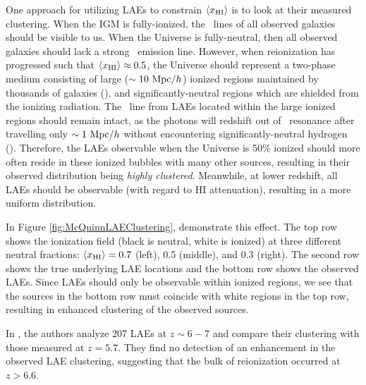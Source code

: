 One approach for utilizing LAEs to constrain $\langle x_{\text{HI}}\rangle$ is to look at their measured clustering. When the IGM is fully-ionized, the \lya\ lines of all observed galaxies should be visible to us. When the Universe is fully-neutral, then all observed galaxies should lack a strong \lya\ emission line. However, when reionization has progressed such that $\langle x_{\text{HI}}\rangle \approx 0.5$, the Universe should represent a two-phase medium consisting of large ($\sim 10\ \text{Mpc/$h$}$) ionized regions maintained by thousands of galaxies (\citealt{McQuinn:2007dy}), and significantly-neutral regions which are shielded from the ionizing radiation. The \lya\ line from LAEs located within the large ionized regions should remain intact, as the photons will redshift out of \lya\ resonance after travelling only $\sim 1\ \text{Mpc/$h$}$ without encountering significantly-neutral hydrogen (\citealt{finlator2012recent}). Therefore, the LAEs observable when the Universe is 50\% ionized should more often reside in these ionized bubbles with many other sources, resulting in their observed distribution being \textit{highly clustered}. Meanwhile, at lower redshift, all LAEs should be observable (with regard to HI attenuation), resulting in a more uniform distribution.

In Figure \ref{fig:McQuinnLAEClustering}, \citet{McQuinn:2007dy} demonstrate this effect. The top row shows the ionization field (black is neutral, white is ionized) at three different neutral fractions: $\langle x_{\text{HI}}\rangle = 0.7$ (left), 0.5 (middle), and 0.3 (right). The second row shows the true underlying LAE locations and the bottom row shows the observed LAEs. Since LAEs should only be observable within ionized regions, we see that the sources in the bottom row must coincide with white regions in the top row, resulting in enhanced clustering of the observed sources.

In \citet{Ouchi2010}, the authors analyze 207 LAEs at $z \sim 6-7$ and compare their clustering with those measured at $z = 5.7$. They find no detection of an enhancement in the observed LAE clustering, suggesting that the bulk of reionization occurred at $z > 6.6$. 



